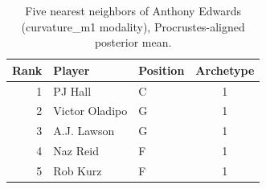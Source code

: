 \begin{table}[htbp]
  \centering\small
  \begin{tabular}{rllc}
    \toprule
    Rank & Player & Position & Archetype \\
    \midrule
    1 & PJ Hall & C & 1 \\
    2 & Victor Oladipo & G & 1 \\
    3 & A.J. Lawson & G & 1 \\
    4 & Naz Reid & F & 1 \\
    5 & Rob Kurz & F & 1 \\
    \bottomrule
  \end{tabular}
  \caption{Five nearest neighbors of Anthony Edwards (curvature_m1 modality), Procrustes-aligned posterior mean.}
  \label{tab:Anthony_Edwards_neighbors_curvature_m1}
\end{table}

